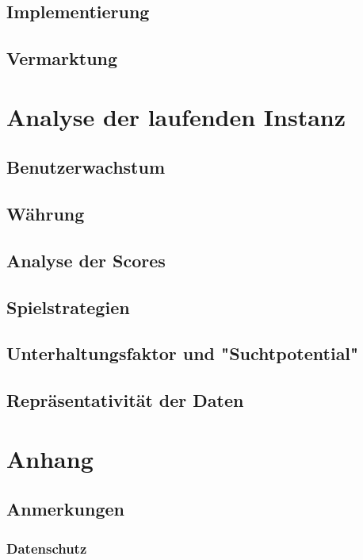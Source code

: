 \documentclass{scrreprt}
\begin{document}
\section{Implementierung}
\section{Vermarktung}

\chapter{Analyse der laufenden Instanz}
\section{Benutzerwachstum}
\section{Währung}
\section{Analyse der Scores}
\section{Spielstrategien}
\section{Unterhaltungsfaktor und "Suchtpotential"}
\section{Repräsentativität der Daten}

\chapter{Anhang}
\section{Anmerkungen}
\subsection{Datenschutz}
\end{document}

